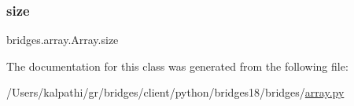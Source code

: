 \mbox{\label{classbridges_1_1array_1_1_array_aeac1b1639d0284500f354d41b40c38f7}} 
\subsubsection{\texorpdfstring{size}{size}}
{\footnotesize\ttfamily bridges.\+array.\+Array.\+size}



The documentation for this class was generated from the following file\+:\begin{DoxyCompactItemize}
\item 
/\+Users/kalpathi/gr/bridges/client/python/bridges18/bridges/\mbox{\hyperlink{array_8py}{array.\+py}}\end{DoxyCompactItemize}
